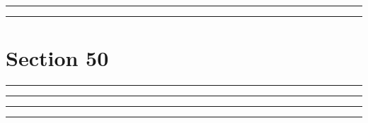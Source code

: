 \documentclass[11pt,a4paper]{article}
\begin{document}
\swarmwrapnext\lipsum[1]\lipsum[2]\lipsum[3]\lipsum[4]\lipsum[5]\lipsum[6]
\begin{swarmwrap}%
  \begin{minipage}[t]{2cm}
    \centering
    \textcolor{red!20}{\rule{\linewidth}{5cm}}
  \end{minipage}%
\end{swarmwrap}%
\swarmwrapnext\lipsum[1]
\begin{swarmwrap}%
  \begin{minipage}[t]{3cm}
    \centering
    \textcolor{red!20}{\rule{\linewidth}{6cm}}
  \end{minipage}%
\end{swarmwrap}%
\swarmwrapnext\lipsum[1]\lipsum[2]
\section{Section 50}
\begin{swarmwrap}%
  \begin{minipage}[t]{4cm}
    \centering
    \textcolor{red!20}{\rule{\linewidth}{7cm}}
  \end{minipage}%
\end{swarmwrap}%
\swarmwrapnext\lipsum[1]\lipsum[2]\lipsum[3]
\begin{swarmwrap}%
  \begin{minipage}[t]{5cm}
    \centering
    \textcolor{red!20}{\rule{\linewidth}{8cm}}
  \end{minipage}%
\end{swarmwrap}%
\swarmwrapnext\lipsum[1]\lipsum[2]\lipsum[3]\lipsum[4]
\begin{swarmwrap}%
  \begin{minipage}[t]{2cm}
    \centering
    \textcolor{red!20}{\rule{\linewidth}{9cm}}
  \end{minipage}%
\end{swarmwrap}%
\swarmwrapnext\lipsum[1]\lipsum[2]\lipsum[3]\lipsum[4]\lipsum[5]
\begin{swarmwrap}%
  \begin{minipage}[t]{3cm}
    \centering
    \textcolor{red!20}{\rule{\linewidth}{10cm}}
  \end{minipage}%
\end{swarmwrap}%
\swarmwrapnext\lipsum[1]\lipsum[2]\lipsum[3]\lipsum[4]\lipsum[5]\lipsum[6]
\end{document}
